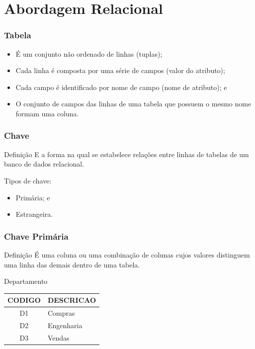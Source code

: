 \documentclass{beamer}
\begin{document}
\section{Abordagem Relacional}

\begin{frame}
\frametitle{Tabela}

\begin{itemize}
	\item É um conjunto não ordenado de linhas (tuplas);
	\item Cada linha é composta por uma série de campos (valor do atributo);
	\item Cada campo é identificado por nome de campo (nome de atributo); e
	\item O conjunto de campos das linhas de uma tabela que possuem o
	mesmo nome formam uma coluna.
\end{itemize}
\end{frame}

\begin{frame}
\frametitle{Chave}

\begin{block}{Definição}
	E a forma na qual se estabelece relações entre linhas de tabelas de um
	banco de dados relacional.
\end{block}\vfill

Tipos de chave:
\begin{itemize}
	\item Primária; e 
	\item Estrangeira.
\end{itemize}
\end{frame}

\begin{frame}
\frametitle{Chave Primária}

\begin{block}{Definição}
	É uma coluna ou uma combinação de colunas cujos valores distinguem uma linha das demais dentro de uma tabela.
\end{block}\vfill

\begin{exampleblock}{Departamento}
\centering
\begin{tabular}{|c|l|}
		\hline
		CODIGO & DESCRICAO \\ \hline
		D1 & Compras \\ \hline
		D2 & Engenharia \\ \hline
		D3 & Vendas \\ \hline
\end{tabular}
\end{exampleblock}		
\end{frame}
\end{document}
